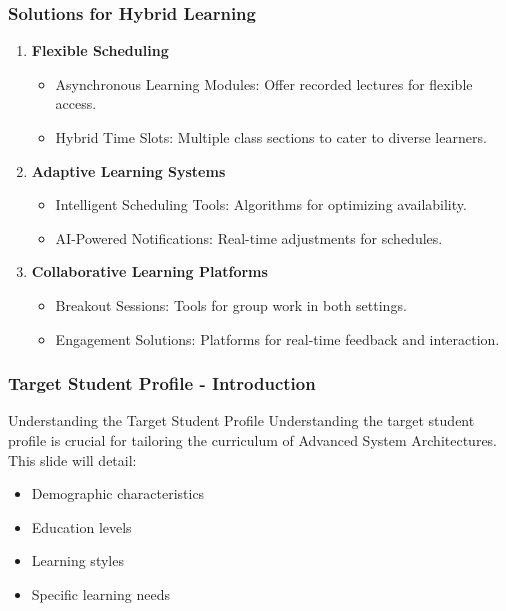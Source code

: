 \documentclass[aspectratio=169]{beamer}
\begin{document}
\begin{frame}[fragile]
    \frametitle{Solutions for Hybrid Learning}
    \begin{enumerate}
        \item \textbf{Flexible Scheduling}
            \begin{itemize}
                \item Asynchronous Learning Modules: Offer recorded lectures for flexible access.
                \item Hybrid Time Slots: Multiple class sections to cater to diverse learners.
            \end{itemize}
        \item \textbf{Adaptive Learning Systems}
            \begin{itemize}
                \item Intelligent Scheduling Tools: Algorithms for optimizing availability.
                \item AI-Powered Notifications: Real-time adjustments for schedules.
            \end{itemize}
        \item \textbf{Collaborative Learning Platforms}
            \begin{itemize}
                \item Breakout Sessions: Tools for group work in both settings.
                \item Engagement Solutions: Platforms for real-time feedback and interaction.
            \end{itemize}
    \end{enumerate}
\end{frame}

\begin{frame}[fragile]
    \frametitle{Target Student Profile - Introduction}
    \begin{block}{Understanding the Target Student Profile}
        Understanding the target student profile is crucial for tailoring the curriculum of Advanced System Architectures. This slide will detail:
    \end{block}
    \begin{itemize}
        \item Demographic characteristics
        \item Education levels
        \item Learning styles
        \item Specific learning needs
    \end{itemize}
\end{frame}
\end{document}
